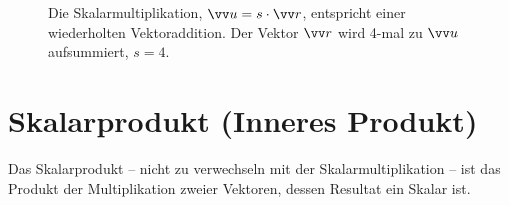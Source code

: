 \begin{figure}[h!]
{
    }
    \caption{Die Skalarmultiplikation, $\protect\ivec{u} = s \cdot \protect\ivec{r}$, entspricht einer wiederholten Vektoraddition. Der Vektor $\protect\ivec{r}$ wird 4-mal zu $\protect\ivec{u}$ aufsummiert, \gDh $s = 4$.}\label{fig: skalarmultiplikation}
\end{figure}


\section{Skalarprodukt (Inneres Produkt)}\label{sec: Skalarprodukt_InneresProdukt}
Das Skalarprodukt -- nicht zu verwechseln mit der Skalarmultiplikation -- ist das Produkt der Multiplikation zweier Vektoren, dessen Resultat ein Skalar ist. 
